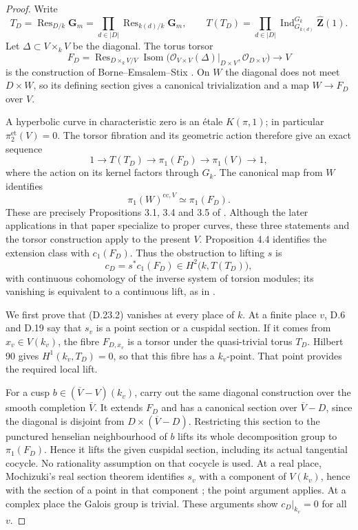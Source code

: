 \begin{proof}
Write
\[
 T_D=\operatorname{Res}_{D/k}\mathbf G_m
     =\prod_{d\in|D|}\operatorname{Res}_{k(d)/k}\mathbf G_m,
 \qquad
 T(T_D)=\prod_{d\in|D|}
    \operatorname{Ind}_{G_{k(d)}}^{G_k}\widehat{\mathbf Z}(1).
\]
Let $\Delta\subset V\times_k V$ be the diagonal.  The torus torsor
\[
 F_D=\operatorname{Res}_{D\times_k V/V}
   \operatorname{Isom}
   \bigl(\mathcal O_{V\times V}(\Delta)|_{D\times V},
         \mathcal O_{D\times V}\bigr)\longrightarrow V
\]
is the construction of Borne--Emsalem--Stix
\cite[Definition 2.1]{D_BorneEmsalemStix2015}.  On $W$ the diagonal
does not meet $D\times W$, so its defining section gives a canonical
trivialization and a map $W\to F_D$ over $V$.

A hyperbolic curve in characteristic zero is an étale $K(\pi,1)$;
in particular $\pi_2^{\mathrm{et}}(V)=0$.  The torsor fibration and
its geometric action therefore give an exact sequence
\[
 1\longrightarrow T(T_D)\longrightarrow\pi_1(F_D)
   \longrightarrow\pi_1(V)\longrightarrow1,
 \tag{D.23.1}
\]
where the action on its kernel factors through $G_k$.
The canonical map from $W$ identifies
\[
 \pi_1(W)^{\mathrm{cc},V}\simeq\pi_1(F_D).
\]
These are precisely Propositions 3.1, 3.4 and 3.5 of
\cite{D_BorneEmsalemStix2015}.  Although the later applications in
that paper specialize to proper curves, these three statements and
the torsor construction apply to the present $V$.  Proposition 4.4
identifies the extension class with $c_1(F_D)$.  Thus the obstruction
to lifting $s$ is
\[
 c_D=s^*c_1(F_D)\in H^2\bigl(k,T(T_D)\bigr),
 \tag{D.23.2}
\]
with continuous cohomology of the inverse system of torsion modules;
its vanishing is equivalent to a continuous lift, as in
\cite[Lemma 4.5]{D_BorneEmsalemStix2015}.

We first prove that (D.23.2) vanishes at every place of $k$.  At a
finite place $v$, D.6 and D.19 say that $s_v$ is a point section or a
cuspidal section.  If it comes from $x_v\in V(k_v)$, the fibre
$F_{D,x_v}$ is a torsor under the quasi-trivial torus $T_D$.
Hilbert 90 gives $H^1(k_v,T_D)=0$, so that this fibre has a $k_v$-point.
That point provides the required local lift.

For a cusp $b\in(\overline V-V)(k_v)$, carry out the same diagonal
construction over the smooth completion $\overline V$.  It extends
$F_D$ and has a canonical section over $\overline V-D$, since the
diagonal is disjoint from $D\times(\overline V-D)$.  Restricting this
section to the punctured henselian neighbourhood of $b$ lifts its
whole decomposition group to $\pi_1(F_D)$.  Hence it lifts the given
cuspidal section, including its actual tangential cocycle.  No
rationality assumption on that cocycle is used.  At a real place,
Mochizuki's real section theorem identifies $s_v$ with a component
of $V(k_v)$, hence with the section of a point in that component
\cite[Corollary 3.13]{D_Mochizuki2003Real}; the point argument applies.
At a complex place the Galois group is trivial.  These arguments
show $c_D|_{k_v}=0$ for all $v$.


\end{proof}
